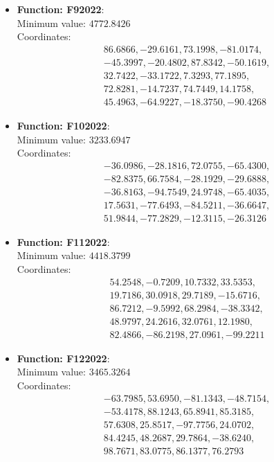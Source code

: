 \documentclass{article}
\begin{document}
\begin{itemize}
  \item \textbf{Function: F92022}: \\
    Minimum value: $4772.8426$ \\
    Coordinates:
    \[
      \begin{aligned}
        & 86.6866,  -29.6161,  73.1998, -81.0174, \\
        & -45.3997,  -20.4802,  87.8342, -50.1619, \\
        & 32.7422,  -33.1722,  7.3293, 77.1895, \\
        & 72.8281,  -14.7237,  74.7449, 14.1758, \\
        & 45.4963,  -64.9227,  -18.3750, -90.4268
      \end{aligned}
    \]

  \item \textbf{Function: F102022}: \\
    Minimum value: $3233.6947$ \\
    Coordinates:
    \[
      \begin{aligned}
        & -36.0986,  -28.1816,  72.0755, -65.4300, \\
        & -82.8375,  66.7584,  -28.1929, -29.6888, \\
        & -36.8163,  -94.7549,  24.9748, -65.4035, \\
        & 17.5631,  -77.6493,  -84.5211, -36.6647, \\
        & 51.9844,  -77.2829,  -12.3115, -26.3126
      \end{aligned}
    \]

  \item \textbf{Function: F112022}: \\
    Minimum value: $4418.3799$ \\
    Coordinates:
    \[
      \begin{aligned}
        & 54.2548,  -0.7209,  10.7332, 33.5353, \\
        & 19.7186,  30.0918,  29.7189, -15.6716, \\
        & 86.7212,  -9.5992,  68.2984, -38.3342, \\
        & 48.9797,  24.2616,  32.0761, 12.1980, \\
        & 82.4866,  -86.2198,  27.0961, -99.2211
      \end{aligned}
    \]

  \item \textbf{Function: F122022}: \\
    Minimum value: $3465.3264$ \\
    Coordinates:
    \[
      \begin{aligned}
        & -63.7985,  53.6950,  -81.1343, -48.7154, \\
        & -53.4178,  88.1243,  65.8941, 85.3185, \\
        & 57.6308,  25.8517,  -97.7756, 24.0702, \\
        & 84.4245,  48.2687,  29.7864, -38.6240, \\
        & 98.7671,  83.0775,  86.1377, 76.2793
      \end{aligned}
    \]

\end{itemize}
\end{document}
